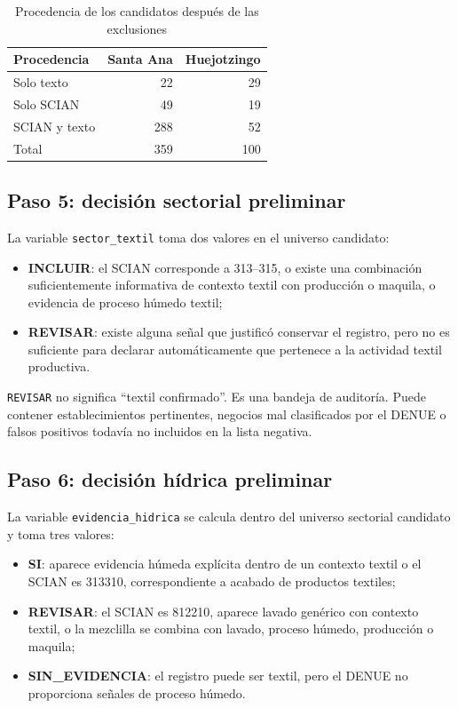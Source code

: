 \documentclass[11pt,letterpaper]{article}
\begin{document}
\begin{table}[H]
\centering
\caption{Procedencia de los candidatos después de las exclusiones}
\begin{tabular}{lrr}
\toprule
Procedencia & Santa Ana & Huejotzingo\\
\midrule
Solo texto & 22 & 29\\
Solo SCIAN & 49 & 19\\
SCIAN y texto & 288 & 52\\
\midrule
Total & 359 & 100\\
\bottomrule
\end{tabular}
\end{table}

\subsection{Paso 5: decisión sectorial preliminar}

La variable \texttt{sector\_textil} toma dos valores en el universo candidato:

\begin{itemize}
  \item \textbf{INCLUIR}: el SCIAN corresponde a 313--315, o existe una combinación suficientemente informativa de contexto textil con producción o maquila, o evidencia de proceso húmedo textil;
  \item \textbf{REVISAR}: existe alguna señal que justificó conservar el registro, pero no es suficiente para declarar automáticamente que pertenece a la actividad textil productiva.
\end{itemize}

\texttt{REVISAR} no significa ``textil confirmado''. Es una bandeja de auditoría. Puede contener establecimientos pertinentes, negocios mal clasificados por el DENUE o falsos positivos todavía no incluidos en la lista negativa.

\subsection{Paso 6: decisión hídrica preliminar}

La variable \texttt{evidencia\_hidrica} se calcula dentro del universo sectorial candidato y toma tres valores:

\begin{itemize}
  \item \textbf{SI}: aparece evidencia húmeda explícita dentro de un contexto textil o el SCIAN es 313310, correspondiente a acabado de productos textiles;
  \item \textbf{REVISAR}: el SCIAN es 812210, aparece lavado genérico con contexto textil, o la mezclilla se combina con lavado, proceso húmedo, producción o maquila;
  \item \textbf{SIN\_EVIDENCIA}: el registro puede ser textil, pero el DENUE no proporciona señales de proceso húmedo.
\end{itemize}
\end{document}
